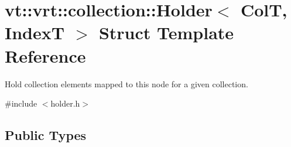 \hypertarget{structvt_1_1vrt_1_1collection_1_1_holder}{}\section{vt\+:\+:vrt\+:\+:collection\+:\+:Holder$<$ ColT, IndexT $>$ Struct Template Reference}
\label{structvt_1_1vrt_1_1collection_1_1_holder}


Hold collection elements mapped to this node for a given collection.  




{\ttfamily \#include $<$holder.\+h$>$}

\subsection*{Public Types}

